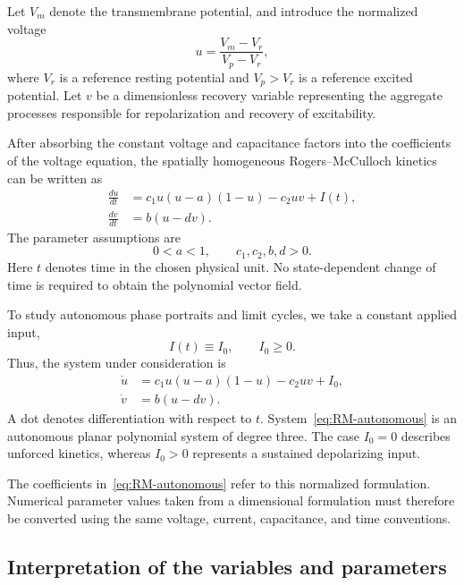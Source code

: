 \documentclass[11pt,reqno]{amsart}
\theoremstyle{plain}
\theoremstyle{definition}
\theoremstyle{remark}
\begin{document}
Let $V_m$ denote the transmembrane potential, and introduce the
normalized voltage
\begin{equation}
\label{eq:normalized-voltage}
u=\frac{V_m-V_r}{V_p-V_r},
\end{equation}
where $V_r$ is a reference resting potential and $V_p>V_r$ is
a reference excited potential. Let $v$ be a dimensionless
recovery variable representing the aggregate processes
responsible for repolarization and recovery of excitability.

After absorbing the constant voltage and capacitance factors
into the coefficients of the voltage equation, the
spatially homogeneous Rogers--McCulloch kinetics can be written as
\begin{equation}
\label{eq:RM-general}
\begin{aligned}
\frac{du}{dt}
&=c_1u(u-a)(1-u)-c_2uv+I(t),\\
\frac{dv}{dt}
&=b(u-dv).
\end{aligned}
\end{equation}
The parameter assumptions are
\begin{equation}
\label{eq:parameters}
0<a<1,
\qquad c_1,c_2,b,d>0.
\end{equation}
Here $t$ denotes time in the chosen physical unit. No
state-dependent change of time is required to obtain
the polynomial vector field.

To study autonomous phase portraits and limit cycles,
we take a constant applied input,
\[
I(t)\equiv I_0,\qquad I_0\geq 0.
\]
Thus, the system under consideration is
\begin{equation}
\label{eq:RM-autonomous}
\boxed{
\begin{aligned}
\dot u
&=c_1u(u-a)(1-u)-c_2uv+I_0,\\
\dot v
&=b(u-dv).
\end{aligned}}
\end{equation}
A dot denotes differentiation with respect to $t$.
System~\eqref{eq:RM-autonomous} is an autonomous planar
polynomial system of degree three. The case $I_0=0$
describes unforced kinetics, whereas $I_0>0$ represents
a sustained depolarizing input.

The coefficients in~\eqref{eq:RM-autonomous} refer to this
normalized formulation. Numerical parameter values taken
from a dimensional formulation must therefore be converted
using the same voltage, current, capacitance, and time
conventions.

\subsection{Interpretation of the variables and parameters}
\label{subsec:interpretation}
\end{document}
